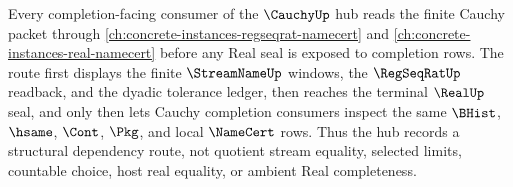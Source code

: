 Every completion-facing consumer of the $\CauchyUp$ hub reads the finite Cauchy packet through \autoref{ch:concrete-instances-regseqrat-namecert} and \autoref{ch:concrete-instances-real-namecert} before any Real seal is exposed to completion rows. The route first displays the finite $\StreamNameUp$ windows, the $\RegSeqRatUp$ readback, and the dyadic tolerance ledger, then reaches the terminal $\RealUp$ seal, and only then lets Cauchy completion consumers inspect the same $\BHist$, $\hsame$, $\Cont$, $\Pkg$, and local $\NameCert$ rows. Thus the hub records a structural dependency route, not quotient stream equality, selected limits, countable choice, host real equality, or ambient Real completeness.
